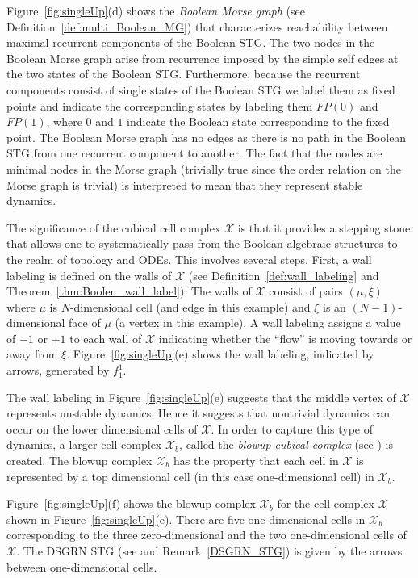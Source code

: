 \documentclass[12pt, notitlepage]{amsart}
\newcommand{\cX}{{\mathcal X}}
\theoremstyle{definition}
\begin{document}
Figure~\ref{fig:singleUp}(d) shows the \textit{Boolean Morse graph} (see Definition~\ref{def:multi_Boolean_MG}) that characterizes reachability between maximal recurrent components of the Boolean STG. The two nodes in the Boolean Morse graph arise from recurrence imposed by the simple self edges at the two states of the Boolean STG. Furthermore, because the recurrent components consist of single states of the Boolean STG we label them as fixed points and indicate the corresponding states by labeling them $FP(0)$ and $FP(1)$, where $0$ and $1$ indicate the Boolean state corresponding to the fixed point. The Boolean Morse graph has no edges as there is no path in the Boolean STG from one recurrent component to another. The fact that the nodes are minimal nodes in the Morse graph (trivially true since the order relation on the Morse graph is trivial) is interpreted to mean that they represent stable dynamics.

The significance of the cubical cell complex $\cX$ is that it provides a stepping stone that allows one to systematically pass from the Boolean algebraic structures to the realm of topology and ODEs. This involves several steps. First, a wall labeling is defined on the walls of $\cX$ (see Definition~\ref{def:wall_labeling} and Theorem~\ref{thm:Boolen_wall_label}). The walls of $\cX$ consist of pairs $(\mu, \xi)$ where $\mu$ is $N$-dimensional cell (and edge in this example) and $\xi$ is an  $(N-1)$-dimensional face of $\mu$ (a vertex in this example). A wall labeling assigns a value of $-1$ or $+1$ to each wall of $\cX$ indicating whether the ``flow'' is moving towards or away from $\xi$. Figure~\ref{fig:singleUp}(e) shows the wall labeling, indicated by arrows, generated by $f_1^1$.

The wall labeling in Figure~\ref{fig:singleUp}(e) suggests that the middle vertex of $\cX$ represents unstable dynamics. Hence it suggests that nontrivial dynamics can occur on the lower dimensional cells of $\cX$. In order to capture this type of dynamics, a larger cell complex $\cX_b$, called the \textit{blowup cubical complex} (see \cite{rook_field:24}) is created. The blowup complex $\cX_b$ has the property that each cell in $\cX$ is represented by a top dimensional cell (in this case one-dimensional cell) in $\cX_b$.

Figure~\ref{fig:singleUp}(f) shows the blowup complex $\cX_b$ for the cell complex $\cX$ shown in Figure~\ref{fig:singleUp}(e). There are five one-dimensional cells in $\cX_b$ corresponding to the three zero-dimensional and the two one-dimensional cells of $\cX$. The DSGRN STG (see \cite{rook_field:24} and Remark~\ref{DSGRN_STG}) is given by the arrows between one-dimensional cells.
\end{document}
